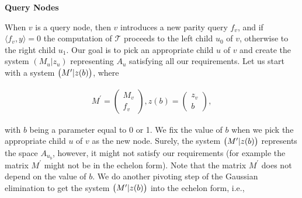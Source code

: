 \documentclass[10pt,a4paper]{article}
\begin{document}
\par\medskip\noindent\textbf{Query Nodes}\par




When $v$ is a query node, then $v$ introduces a new parity query $f_{v}$, and if $\langle f_{v},y\rangle=0$ the computation of $\mathcal{T}$ proceeds to the left child $u_{0}$ of $v$, otherwise to the right child $u_{1}$.
Our goal is to pick an appropriate child $u$ of $v$ and create the system $(M_{u}|z_{u})$ representing $A_{u}$ satisfying all our requirements.
Let us start with a system $\bigl{(}M^{\prime}|z(b)\bigr{)}$, where\par


\[\begin{gathered}
M^{\prime}=\begin{pmatrix}M_{v}\\
f_{v}\end{pmatrix},z(b)=\begin{pmatrix}z_{v}\\
b\end{pmatrix},
\end{gathered}\]


with $b$ being a parameter equal to 0 or 1.
We fix the value of $b$ when we pick the appropriate child $u$ of $v$ as the new node.
Surely, the system $\bigl{(}M^{\prime}|z(b)\bigr{)}$ represents the space $A_{u_{b}}$, however, it might not satisfy our requirements (for example the matrix $M^{\prime}$ might not be in the echelon form).
Note that the matrix $M^{\prime}$ does not depend on the value of $b$.
We do another pivoting step of the Gaussian elimination to get the system $\bigl{(}M^{\prime}|z(b)\bigr{)}$ into the echelon form, i.e.,\par
\end{document}
